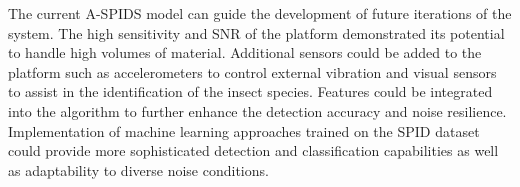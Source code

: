 \documentclass[../Vibro-Acoustic Signatures and Detection Algorithms for Stored Product Insects.tex]{subfiles}
\begin{document}
The current A-SPIDS model can guide the development of future iterations of the system. The high sensitivity and SNR of the platform demonstrated its potential to handle high volumes of material. Additional sensors could be added to the platform such as accelerometers to control external vibration and visual sensors to assist in the identification of the insect species. Features could be integrated into the algorithm to further enhance the detection accuracy and noise resilience. Implementation of machine learning approaches trained on the SPID dataset could provide more sophisticated detection and classification capabilities as well as adaptability to diverse noise conditions. 

\newpage
\end{document}
